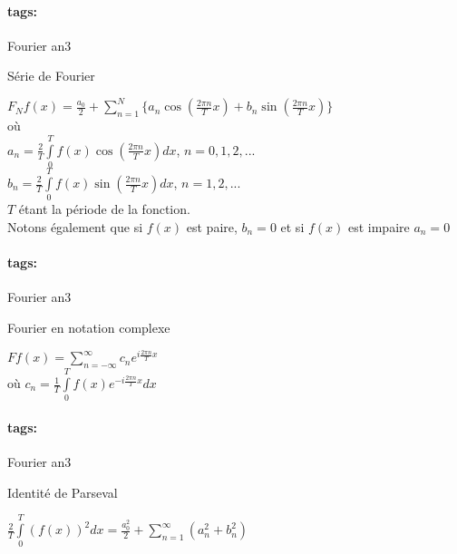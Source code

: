 \documentclass[12pt]{article}
\newcommand*{\xfield}[1]{\begin{mdframed}\centering #1\end{mdframed}\bigskip}
\newenvironment{note}{}{}
\newcommand*{\tags}[1]{\paragraph{tags: }#1}
\begin{document}
\begin{note}
	\tags{Fourier an3}
	\xfield{Série de Fourier}
	\xfield{$F_N f(x) =  \frac{a_0}{2} + \sum\limits_{n=1}^N \lbrace a_n \cos\left(\frac{2\pi n}{T} x \right) + b_n \sin\left(\frac{2\pi n}{T} x \right)\rbrace$\\
où\\
$a_n = \frac{2}{T} \int\limits_0^T f(x)\cos\left(
      \frac{2\pi n}{T} x \right) dx$, $n=0,1,2,...$\\
$b_n = \frac{2}{T} \int\limits_0^T f(x)\sin\left(
      \frac{2\pi n}{T} x \right) dx$, $n=1,2,...$\\
$T$ étant la période de la fonction.\\
Notons également que si $f(x)$ est paire,
$b_n = 0$ et si $f(x)$ est impaire $a_n = 0$}
\end{note}

\begin{note}
	\tags{Fourier an3}
	\xfield{Fourier en notation complexe}
	\xfield{$Ff(x) = \sum\limits_{n=-\infty}^{\infty} c_n e^{i \frac{2\pi n}{T}
      x}$\\
où $c_n = \frac{1}{T}\int\limits_0^T f(x) e^{-i \frac{2\pi n}{T} x} dx$}
\end{note}


\begin{note}
	\tags{Fourier an3}
	\xfield{Identité de Parseval}
	\xfield{$\frac{2}{T} \int\limits_0^T(f(x))^2 dx = \frac{a_0^2}{2} +
    \sum\limits_{n=1}^{\infty} (a_n^2 + b_n^2)$}
\end{note}
\end{document}
